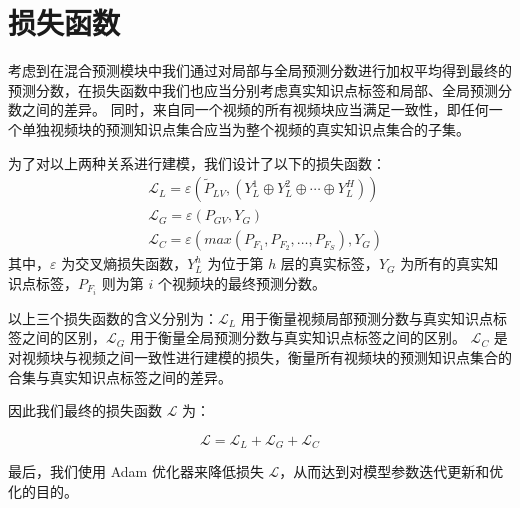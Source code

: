 \section{损失函数}
    考虑到在混合预测模块中我们通过对局部与全局预测分数进行加权平均得到最终的预测分数，在损失函数中我们也应当分别考虑真实知识点标签和局部、全局预测分数之间的差异。
    同时，来自同一个视频的所有视频块应当满足一致性，即任何一个单独视频块的预测知识点集合应当为整个视频的真实知识点集合的子集。

    为了对以上两种关系进行建模，我们设计了以下的损失函数：
    \begin{equation}
        \begin{aligned}
            &\mathcal{L}_L = \varepsilon\left(\tilde{P}_{LV}, \left(Y_L^1 \oplus Y_L^2 \oplus \cdots \oplus Y_L^H\right)\right) \\
            &\mathcal{L}_G = \varepsilon\left(P_{GV}, Y_G\right) \\
            &\mathcal{L}_C = \varepsilon\left(max\left(P_{F_1}, P_{F_2}, \dots, P_{F_S}\right), Y_G\right)
        \end{aligned}
    \end{equation}
    其中，$\varepsilon$ 为交叉熵损失函数，$Y_L^h$ 为位于第 $h$ 层的真实标签，$Y_G$ 为所有的真实知识点标签，$P_{F_i}$ 则为第 $i$ 个视频块的最终预测分数。

    以上三个损失函数的含义分别为：$\mathcal{L}_L$ 用于衡量视频局部预测分数与真实知识点标签之间的区别，$\mathcal{L}_G$ 用于衡量全局预测分数与真实知识点标签之间的区别。
    $\mathcal{L}_C$ 是对视频块与视频之间一致性进行建模的损失，衡量所有视频块的预测知识点集合的合集与真实知识点标签之间的差异。

    因此我们最终的损失函数 $\mathcal{L}$ 为：

    \begin{equation}
        \mathcal{L} = \mathcal{L}_L + \mathcal{L}_G + \mathcal{L}_C
    \end{equation}

    最后，我们使用 Adam\cite{Kingma2015AdamAM} 优化器来降低损失 $\mathcal{L}$，从而达到对模型参数迭代更新和优化的目的。
